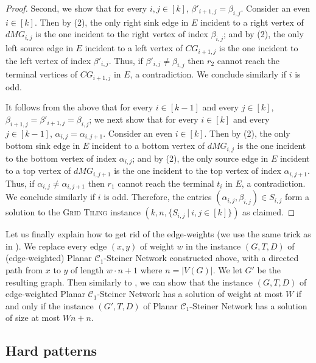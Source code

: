 \documentclass[a4paper,11pt]{article}
\theoremstyle{plain}
\newtheorem{identification rule}{Identification Rule}
\theoremstyle{definition}
\theoremstyle{remark}
\begin{document}
\begin{proof}
Second, we show that for every $i,j \in [k]$, $\beta'_{i+1,j} = \beta_{i,j}$. Consider an even $i \in [k]$. Then by (2), the only right sink edge in $E$ incident to a right vertex of $dMG_{i,j}$ is the one incident to the right vertex of index $\beta_{i,j}$; and by (2), the only left source edge in $E$ incident to a left vertex of $CG_{i+1,j}$ is the one incident to the left vertex of index $\beta'_{i,j}$. Thus, if $\beta'_{i,j} \neq \beta_{i,j}$ then $r_2$ cannot reach the terminal vertices of $CG_{i+1,j}$ in $E$, a contradiction. We conclude similarly if $i$ is odd. 

It follows from the above that for every $i \in [k-1]$ and every $j \in [k]$, $\beta_{i+1,j} = \beta'_{i+1,j} = \beta_{i,j}$; we next show that for every $i \in [k]$ and every $j \in [k-1]$, $\alpha_{i,j} = \alpha_{i,j+1}$. Consider an even $i \in [k]$. Then by (2), the only bottom sink edge in $E$ incident to a bottom vertex of $dMG_{i,j}$ is the one incident to the bottom vertex of index $\alpha_{i,j}$; and by (2), the only source edge in $E$ incident to a top vertex of $dMG_{i,j+1}$ is the one incident to the top vertex of index $\alpha_{i,j+1}$. Thus, if $\alpha_{i,j} \neq \alpha_{i,j+1}$ then $r_1$ cannot reach the terminal $t_i$ in $E$, a contradiction. We conclude similarly if $i$ is odd. Therefore, the entries $(\alpha_{i,j},\beta_{i,j}) \in S_{i,j}$ form a solution to the \textsc{Grid Tiling} instance $(k,n,\{S_{i,j}~|~i,j \in [k]\})$ as claimed.
\end{proof}

Let us finally explain how to get rid of the edge-weights (we use the same trick as in \cite{ChitnisFHM20}).
We replace every edge $(x,y)$ of weight $w$ in the instance $(G,T,D)$ of (edge-weighted) {\sc Planar $\mathcal{C}_1$-Steiner Network} constructed above,
with a directed path from $x$ to $y$ of length $w\cdot n + 1$ where $n = |V(G)|$. 
We let $G'$ be the resulting graph.
Then similarly to \cite[Theorem A.1]{ChitnisFHM20}, we can show that the instance $(G,T,D)$ of edge-weighted {\sc Planar $\mathcal{C}_1$-Steiner Network} has a solution of weight at most $W$ if and only if the instance $(G',T,D)$ of {\sc Planar $\mathcal{C}_1$-Steiner Network} has a solution of size at most $Wn + n$.

\subsection{Hard patterns}
\end{document}
